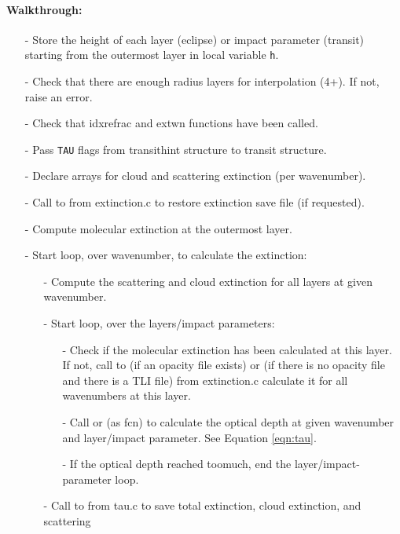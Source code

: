 \documentclass[letterpaper,12pt]{article}
\begin{document}
\paragraph{Walkthrough:}
\begin{enumerate}[leftmargin=10pt, noitemsep, parsep=0pt, topsep=0ex]
\item[-] Store the height of each layer (eclipse) or impact parameter (transit)
     starting from the outermost layer in local variable {\tt h}.
\item[-] Check that there are enough radius layers for interpolation (4+).  If not, raise an error.
\item[-] Check that idxrefrac and extwn functions have been called.
\item[-] Pass {\tt TAU} flags from transithint structure to transit structure.
\item[-] Declare arrays for cloud and scattering extinction (per wavenumber).
\item[-] Call to  from extinction.c to restore extinction save file (if requested).
\item[-] Compute molecular extinction at the outermost layer.
\item[-] Start loop, over wavenumber, to calculate the extinction:
\begin{enumerate}[leftmargin=10pt, noitemsep, parsep=0pt, topsep=0ex]
  \item[-] Compute the scattering and cloud extinction for all layers at
    given wavenumber.
  \item[-] Start loop, over the layers/impact parameters:
  \begin{enumerate}[leftmargin=10pt, noitemsep, parsep=0pt, topsep=0ex]
  \item[-] Check if the molecular extinction has been calculated at this
    layer. If not, call to  (if an opacity file exists) or  (if there is no opacity file and there is a TLI file) from extinction.c calculate it for all wavenumbers at this layer.
  \item[-] Call  or  (as fcn) to calculate the
    optical depth at given wavenumber and layer/impact parameter. See Equation \ref{eqn:tau}.
  \item[-] If the optical depth reached toomuch, end the
    layer/impact-parameter loop.
  \end{enumerate}
  \item[-] Call to  from tau.c to save total extinction, cloud extinction, and scattering 

\end{enumerate}
\end{enumerate}
\end{document}
